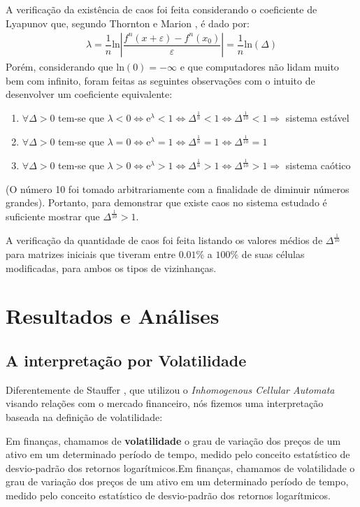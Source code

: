 \documentclass[
	12pt,				%
	openright,			%
	twoside,			%
	a4paper,			%
	english,			%
	french,				%
	spanish,			%
	brazil				%
	]{abntex2}
\begin{document}
  A verificação da existência de caos foi feita considerando o coeficiente de Lyapunov que, segundo Thornton e Marion \cite{marion}, é dado por: 
  \begin{align}
    \lambda = \dfrac{1}{n} \mathrm{ln}\left|\dfrac{f^n(x+\varepsilon) - f^n(x_0)}{\varepsilon}\right| = \dfrac{1}{n} \mathrm{ln}(\Delta)
  \end{align}
  Porém, considerando que $\mathrm{ln}(0)=-\infty$ e que computadores não lidam muito bem com infinito, foram feitas as seguintes observações com o intuito de desenvolver um coeficiente equivalente:
  \begin{enumerate}
    \item $\forall \Delta > 0$ tem-se que $\lambda < 0 \Leftrightarrow \mathrm{e}^\lambda < 1 \Leftrightarrow \Delta^\frac{1}{n} < 1 \Leftrightarrow \Delta^\frac{1}{10} < 1 \Rightarrow$ sistema estável 
    \item $\forall \Delta > 0$ tem-se que $\lambda = 0 \Leftrightarrow \mathrm{e}^\lambda = 1 \Leftrightarrow \Delta^\frac{1}{n} = 1 \Leftrightarrow \Delta^\frac{1}{10} = 1$ 
    \item $\forall \Delta > 0$ tem-se que $\lambda > 0 \Leftrightarrow \mathrm{e}^\lambda > 1 \Leftrightarrow \Delta^\frac{1}{n} > 1 \Leftrightarrow \Delta^\frac{1}{10} > 1 \Rightarrow$ sistema caótico 
  \end{enumerate}
 (O número 10 foi tomado arbitrariamente com a finalidade de diminuir números grandes). Portanto, para demonstrar que existe caos no sistema estudado é suficiente mostrar que $\Delta^\frac{1}{10} > 1$. 
 
 A verificação da quantidade de caos foi feita listando os valores médios de $\Delta^\frac{1}{10}$ para matrizes iniciais que tiveram entre $0.01\%$ a $100\%$ de suas células modificadas, para ambos os tipos de vizinhanças.



\chapter{Resultados e Análises}

\section{A interpretação por Volatilidade}

Diferentemente de Stauffer \cite{stauffer}, que utilizou o \textit{Inhomogenous Cellular Automata} visando relações com o mercado financeiro, nós fizemos uma interpretação baseada na definição de volatilidade:
\begin{citacao}
  Em finanças, chamamos de \textbf{volatilidade} o grau de variação dos preços de um ativo em
um determinado período de tempo, medido pelo conceito estatístico de desvio-padrão dos
retornos logarítmicos.Em finanças, chamamos de volatilidade o grau de variação dos preços de um ativo em
um determinado período de tempo, medido pelo conceito estatístico de desvio-padrão dos
retornos logarítmicos. \cite{anbima3}
\end{citacao}
\end{document}
